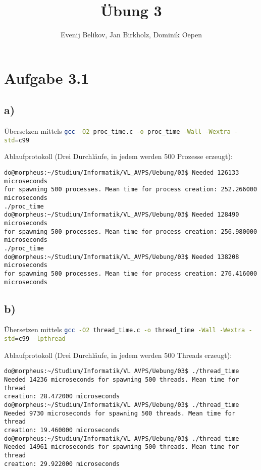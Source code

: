 \documentclass{scrartcl}
\begin{document}
\title{Übung 3}
\author{Evenij Belikov, Jan Birkholz, Dominik Oepen}
\maketitle

\section*{Aufgabe 3.1}

\subsection*{a)}



Übersetzen mittels \lstinline[language=Bash]$gcc -O2 proc_time.c -o proc_time -Wall -Wextra -std=c99$

Ablaufprotokoll (Drei Durchläufe, in jedem werden 500 Prozesse erzeugt):\\
\begin{verbatim}
do@morpheus:~/Studium/Informatik/VL_AVPS/Uebung/03$ Needed 126133 microseconds
for spawning 500 processes. Mean time for process creation: 252.266000 microseconds
./proc_time
do@morpheus:~/Studium/Informatik/VL_AVPS/Uebung/03$ Needed 128490 microseconds
for spawning 500 processes. Mean time for process creation: 256.980000 microseconds
./proc_time
do@morpheus:~/Studium/Informatik/VL_AVPS/Uebung/03$ Needed 138208 microseconds
for spawning 500 processes. Mean time for process creation: 276.416000 microseconds
\end{verbatim}


\subsection*{b)}



Übersetzen mittels \lstinline[language=Bash]$gcc -O2 thread_time.c -o thread_time -Wall -Wextra -std=c99 -lpthread$

Ablaufprotokoll (Drei Durchläufe, in jedem werden 500 Threads erzeugt):\\
\begin{verbatim}
do@morpheus:~/Studium/Informatik/VL AVPS/Uebung/03$ ./thread_time 
Needed 14236 microseconds for spawning 500 threads. Mean time for thread
creation: 28.472000 microseconds
do@morpheus:~/Studium/Informatik/VL AVPS/Uebung/03$ ./thread_time 
Needed 9730 microseconds for spawning 500 threads. Mean time for thread
creation: 19.460000 microseconds
do@morpheus:~/Studium/Informatik/VL AVPS/Uebung/03$ ./thread_time 
Needed 14961 microseconds for spawning 500 threads. Mean time for thread
creation: 29.922000 microseconds

\end{verbatim}
\end{document}
